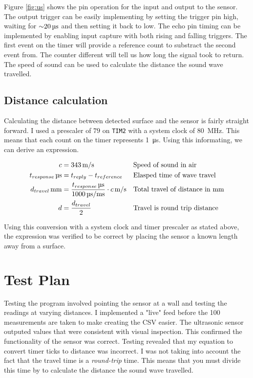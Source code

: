 \documentclass[CMPE]{KGCOEReport}
\def\code#1{\texttt{#1}}
\begin{document}
	Figure \ref{fig:us} shows the pin operation for the input and output to the
	sensor. The output trigger can be easily implementing by setting the trigger
	pin high, waiting for $\SI{\sim 20}{\micro\s}$ and then setting it back to low.
	The echo pin timing can be implemented by enabling input capture with both rising
	and falling triggers. The first event on the timer will provide a reference count
	to substract the second event from. The counter different will tell us how long the
	signal took to return. The speed of sound can be used to calculate the distance the
	sound wave travelled.

	\subsection*{Distance calculation}

	Calculating the distance between detected surface and the sensor is fairly
	straight forward. I used a prescaler of $79$ on \code{TIM2} with a system
	clock of \SI{80}{\mega\Hz}. This means that each count on the timer represents
	\SI{1}{\micro\s}. Using this informating, we can derive an expression.

	\begin{align*}
		c &= \SI{343}{\m/\s} && \text{Speed of sound in air}\\
		\SI[parse-numbers=false]{t_{response}}{\micro\s} &= t_{reply} - t_{reference} && \text{Elasped time of wave travel}\\
		\SI[parse-numbers=false]{d_{travel}}{\milli\m} &= \frac{\SI[parse-numbers=false]{t_{response}}{\micro\s}}{\SI{1000}{\micro\s/\milli\s}} \cdot \SI[parse-numbers=false]{c}{\m/\s} && \text{Total travel of distance in mm}\\
		d &= \frac{d_{travel}}{2} && \text{Travel is round trip distance}
	\end{align*}

	Using this conversion with a system clock and timer prescaler as stated above,
	the expression was verified to be correct by placing the sensor a known length
	away from a surface.

    \section*{Test Plan}

    Testing the program involved pointing the sensor at a wall and testing the readings
    at varying distances. I implemented a "live" feed before the 100 measurements are
    taken to make creating the CSV easier. The ultrasonic sensor outputed values that
    were consistent with visual inspection. This confirmed the functionality of the
    sensor was correct. Testing revealed that my equation to convert timer ticks to
    distance was incorrect. I was not taking into account the fact that the travel
    time is a \emph{round-trip} time. This means that you must divide this time by to
    calculate the distance the sound wave travelled.
\end{document}
